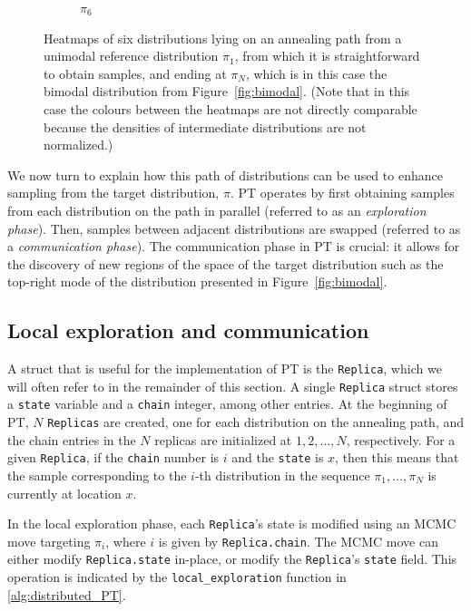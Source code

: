 \begin{figure}[t]
\begin{subfigure}{0.15\textwidth}
      \caption*{$\pi_6$}
    \end{subfigure}
    \caption{Heatmaps of six distributions lying on an annealing path 
    from a unimodal reference distribution  
    $\pi_1$, from which it is straightforward to obtain samples, and ending at 
    $\pi_N$, which is in this case the bimodal distribution from 
    Figure~\ref{fig:bimodal}. (Note that in this case the colours between the heatmaps 
    are not directly comparable because the densities of intermediate distributions 
    are not normalized.)}
    \label{fig:path}
\end{figure}

We now turn to explain how this path of distributions can be used to enhance 
sampling from the target distribution, $\pi$. 
PT operates by first obtaining samples from each distribution on the path in parallel 
(referred to as an \textit{exploration phase}). 
Then, samples between adjacent distributions are swapped (referred to as 
a \textit{communication phase}). The communication phase in PT is crucial: it allows 
for the discovery of new regions of the space of the target distribution such as 
the top-right mode of the distribution presented in Figure~\ref{fig:bimodal}. 


\subsection{Local exploration and communication}
A struct that is useful for the implementation of PT is the \texttt{Replica}, 
which we will often refer to in the remainder of this section. 
A single \texttt{Replica} struct stores a \texttt{state} variable and a \texttt{chain} 
integer, among other entries. 
At the beginning of PT, $N$ \texttt{Replicas} are created, 
one for each distribution on the annealing path, and 
the chain entries in the $N$ replicas are initialized at $1,2,\ldots,N$, respectively. 
For a given \texttt{Replica}, if the \texttt{chain} number is $i$ and the \texttt{state}
is $x$, then this means that the sample corresponding to the $i$-th distribution in 
the sequence $\pi_1, \ldots, \pi_N$ is currently at location $x$.  

\medskip 
In the local exploration phase,
each \texttt{Replica}'s state is modified using an MCMC move targeting $\pi_i$,
where $i$ is given by \texttt{Replica.chain}.
The MCMC move can either modify \texttt{Replica.state} in-place, or modify the 
\texttt{Replica}'s \texttt{state} field. 
This operation is indicated by the \texttt{local\_exploration} function in 
\cref{alg:distributed_PT}.

